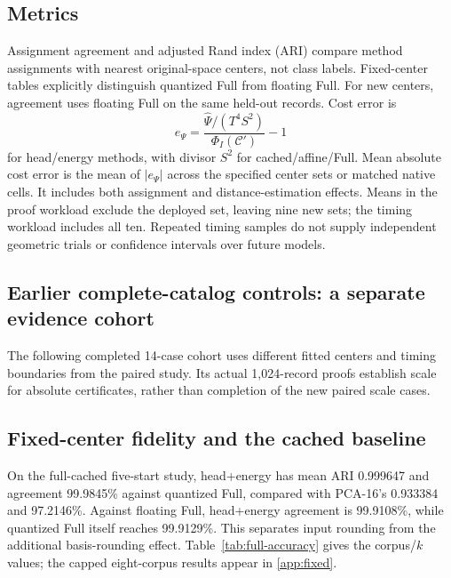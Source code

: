 \subsection{Metrics}
Assignment agreement and adjusted Rand index (ARI) compare method assignments with nearest original-space centers, not class labels. Fixed-center tables explicitly distinguish quantized Full from floating Full. For new centers, agreement uses floating Full on the same held-out records. Cost error is
\begin{equation}
e_\Psi=\frac{\widehat\Psi/(T^4S^2)}{\Phi_I(\mathcal C')}-1
\end{equation}
for head/energy methods, with divisor $S^2$ for cached/affine/Full. Mean absolute cost error is the mean of $|e_\Psi|$ across the specified center sets or matched native cells. It includes both assignment and distance-estimation effects. Means in the proof workload exclude the deployed set, leaving nine new sets; the timing workload includes all ten. Repeated timing samples do not supply independent geometric trials or confidence intervals over future models.



\subsection{Earlier complete-catalog controls: a separate evidence cohort}
The following completed 14-case cohort uses different fitted centers and timing boundaries from the paired study. Its actual 1,024-record proofs establish scale for absolute certificates, rather than completion of the new paired scale cases.



\subsection{Fixed-center fidelity and the cached baseline}\label{sec:results}
On the full-cached five-start study, head+energy has mean ARI 0.999647 and agreement 99.9845\% against quantized Full, compared with PCA-16's 0.933384 and 97.2146\%. Against floating Full, head+energy agreement is 99.9108\%, while quantized Full itself reaches 99.9129\%. This separates input rounding from the additional basis-rounding effect. Table~\ref{tab:full-accuracy} gives the corpus/$k$ values; the capped eight-corpus results appear in \ref{app:fixed}.


